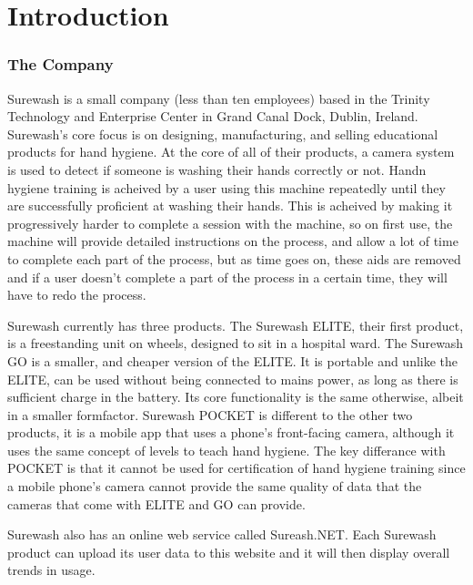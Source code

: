 \part{Introduction}
\section{The Company}
Surewash is a small company (less than ten employees) based in the Trinity Technology and Enterprise Center in Grand Canal Dock, Dublin, Ireland. Surewash's core focus is on designing, manufacturing, and selling educational products for hand hygiene. At the core of all of their products, a camera system is used to detect if someone is washing their hands correctly or not. Handn hygiene training is acheived by a user using this machine repeatedly until they are successfully proficient at washing their hands. This is acheived by making it progressively harder to complete a session with the machine, so on first use, the machine will provide detailed instructions on the process, and allow a lot of time to complete each part of the process, but as time goes on, these aids are removed and if a user doesn't complete a part of the process in a certain time, they will have to redo the process.

Surewash currently has three products. The Surewash ELITE, their first product, is a freestanding unit on wheels, designed to sit in a hospital ward. The Surewash GO is a smaller, and cheaper version of the ELITE. It is portable and unlike the ELITE, can be used without being connected to mains power, as long as there is sufficient charge in the battery. Its core functionality is the same otherwise, albeit in a smaller formfactor. Surewash POCKET is different to the other two products, it is a mobile app that uses a phone's front-facing camera, although it uses the same concept of levels to teach hand hygiene. The key differance with POCKET is that it cannot be used for certification of hand hygiene training since a mobile phone's camera cannot provide the same quality of data that the cameras that come with ELITE and GO can provide.

Surewash also has an online web service called Sureash.NET. Each Surewash product can upload its user data to this website and it will then display overall trends in usage.

